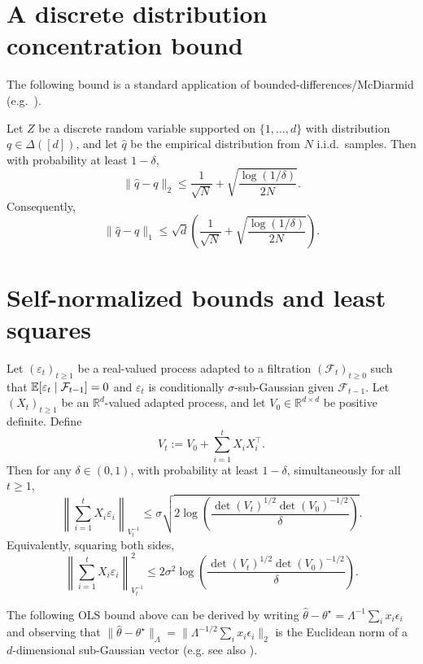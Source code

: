 \section{A discrete distribution concentration bound}

The following bound is a standard application of bounded-differences/McDiarmid
(e.g.\ \citep{McD89}).

\begin{proposition}\label{app:discrete}
Let $Z$ be a discrete random variable supported on $\{1,\dots,d\}$ with
distribution $q\in\Delta([d])$, and let $\widehat q$ be the empirical distribution
from $N$ i.i.d.\ samples. Then with probability at least $1-\delta$,
\[
\|\widehat q-q\|_2
\le
\frac{1}{\sqrt{N}} + \sqrt{\frac{\log(1/\delta)}{2N}}.
\]
Consequently,
\[
\|\widehat q-q\|_1
\le
\sqrt{d}\left(\frac{1}{\sqrt{N}} + \sqrt{\frac{\log(1/\delta)}{2N}}\right).
\]
\end{proposition}

\section{Self-normalized bounds and least squares}

\begin{lemma}
\label{lemma:self_norm}
Let $(\varepsilon_t)_{t\ge 1}$ be a real-valued process adapted to a filtration
$(\mathcal{F}_t)_{t\ge 0}$ such that $\mathbb{E}[\varepsilon_t\mid \mathcal{F}_{t-1}]=0$
and $\varepsilon_t$ is conditionally $\sigma$-sub-Gaussian given $\mathcal{F}_{t-1}$.
Let $(X_t)_{t\ge 1}$ be an $\mathbb{R}^d$-valued adapted process, and let
$V_0\in\mathbb{R}^{d\times d}$ be positive definite. Define
\[
V_t := V_0 + \sum_{i=1}^t X_iX_i^\top.
\]
Then for any $\delta\in(0,1)$, with probability at least $1-\delta$,
simultaneously for all $t\ge 1$,
\[
\left\|\sum_{i=1}^t X_i\varepsilon_i\right\|_{V_t^{-1}}
\le
\sigma\sqrt{2\log\!\left(\frac{\det(V_t)^{1/2}\det(V_0)^{-1/2}}{\delta}\right)}.
\]
Equivalently, squaring both sides,
\[
\left\|\sum_{i=1}^t X_i\varepsilon_i\right\|_{V_t^{-1}}^2
\le
2\sigma^2\log\!\left(\frac{\det(V_t)^{1/2}\det(V_0)^{-1/2}}{\delta}\right).
\]
\end{lemma}

The following OLS bound above can be derived by writing
$\hat\theta-\theta^\star = \Lambda^{-1}\sum_i x_i\epsilon_i$ and observing that
$\|\hat\theta-\theta^\star\|_\Lambda = \|\Lambda^{-1/2}\sum_i x_i\epsilon_i\|_2$
is the Euclidean norm of a $d$-dimensional sub-Gaussian vector (e.g. see also \citep{Hsu2012RandomDA}).

